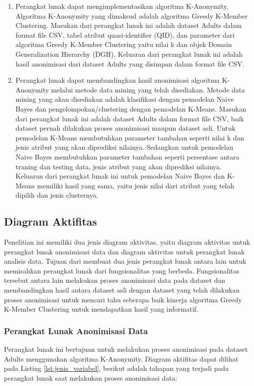 \begin{enumerate}

\item Perangkat lunak dapat mengimplementasikan algoritma K-Anonymity. Algoritma K-Anonymity yang dimaksud adalah algoritma Greedy K-Member Clustering. Masukan dari perangkat lunak ini adalah dataset Adults dalam format file CSV, tabel atribut quasi-identifier (QID), dan parameter dari algoritma Greedy K-Member Clustering yaitu nilai k dan objek Domain Generalization Hierarchy (DGH). Keluaran dari perangkat lunak ini adalah hasil anonimisasi dari dataset Adults yang disimpan dalam format file CSV.

\item Perangkat lunak dapat membandingkan hasil anonimisasi algoritma K-Anonymity melalui metode data mining yang telah disediakan. Metode data mining yang akan disediakan adalah klasifikasi dengan pemodelan Naive Bayes dan pengelompokan/clustering dengan pemodelan K-Means. Masukan dari perangkat lunak ini adalah dataset Adults dalam format file CSV, baik dataset pernah dilakukan proses anonimisasi maupun dataset asli. Untuk pemodelan K-Means membutuhkan parameter tambahan seperti nilai k dan jenis atribut yang akan diprediksi nilainya. Sedangkan untuk pemodelan Naive Bayes membutuhkan parameter tambahan seperti persentase antara traning dan testing data, jenis atribut yang akan diprediksi nilainya. Keluaran dari perangkat lunak ini untuk pemodelan Naive Bayes dan K-Means memiliki hasil yang sama, yaitu jenis nilai dari atribut yang telah dipilih dan jenis clusternya.

\end{enumerate}

\subsection{Diagram Aktifitas}
Penelitian ini memiliki dua jenis diagram aktivitas,  yaitu diagram aktivitas untuk perangkat lunak anonimisasi data dan diagram aktivitas untuk perangkat lunak analisis data. Tujuan dari membuat dua jenis perangkat lunak antara lain untuk memisahkan perangkat lunak dari fungsionalitas yang berbeda. Fungsionalitas tersebut antara lain melakukan proses anonimisasi data pada dataset dan membandingkan hasil antara dataset asli dengan dataset yang telah dilakukan proses anonimisasi untuk mencari tahu seberapa baik kinerja algoritma Greedy K-Member Clustering untuk mendapatkan hasil yang informatif.

\subsubsection{Perangkat Lunak Anonimisasi Data}
Perangkat lunak ini bertujuan untuk melakukan proses anonimisasi pada dataset Adults menggunakan algoritma K-Anonymity. Diagram aktifitas dapat dilihat pada Listing \ref{lst:jenis_variabel}, berikut adalah tahapan yang terjadi pada perangkat lunak saat melakukan proses anonimisasi data:


